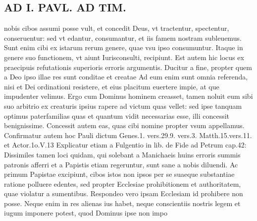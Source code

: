 \documentclass{article}
\begin{document}
\begin{pages}
\section*{AD I. PAVL. AD TIM. }
\marginpar{[ p.192 ]}\pstart nobis cibos assumi posse vult, et concedit Deus, vt tractentur, spectentur, conseruentur: sed vt edantur, consumantur, et iis famem nostram subleuemus. Sunt enim cibi ex istarum rerum genere, quae vsu ipso consumuntur. Itaque in genere suo functionem, vt aiunt Iurisconsulti, recipiunt. Est autem hic locus ex praecipuis refutationis superioris erroris argumentis. Ducitur a fine, propter quem a Deo ipso illae res sunt conditae et creatae Ad eum enim sunt omnia referenda, nisi et Dei ordinationi resistere, et eius placitum euertere impie, at que impudenter velimus. Ergo cum Dominus hominem creasset, tamen noluit eum sibi suo arbitrio ex creaturis ipsius rapere ad victum quas vellet: sed ipse tanquam optimus paterfamilias quas et quantum vidit necessarias esse, illi concessit benignissime. Concessit autem eas, quas cibi nomine propter vsum appellamus. Confirmatur autem hoc Pauli dictum Genes.1. vers.29.9. vers.3. Matth.15.vers.11. et Actor.1o.V.13 Explicatur etiam a Fulgentio in lib.  de Fide ad Petrum cap.42: Dissimiles tamen loci quidam, qui solebant a Manichaeis huins erroris summis patronis afferri et a Papistis etiam regeruntur, sunt sane a nobis diluendi. Ac primum Papistae excipiunt, cibos istos non ipsos per se suaeque substantiae ratione polluere edentes, sed propter Ecclesiae prohibitionem et authoritatem, quae violatur a sumentibus. Respondeo vero ipsam Ecclesiam id prohibere non posse. Neque enim in res alienas ius habet, neque conscientiis nostris legem et iugum imponere potest, quod Dominus ipse non impo\pend

\end{pages}
\end{document}
